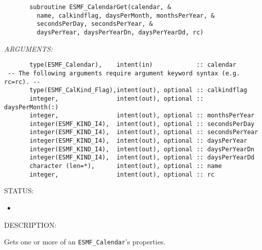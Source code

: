  
\begin{verbatim}       subroutine ESMF_CalendarGet(calendar, &
         name, calkindflag, daysPerMonth, monthsPerYear, &
         secondsPerDay, secondsPerYear, &
         daysPerYear, daysPerYearDn, daysPerYearDd, rc)
 \end{verbatim}{\em ARGUMENTS:}
\begin{verbatim}       type(ESMF_Calendar),    intent(in)            :: calendar
 -- The following arguments require argument keyword syntax (e.g. rc=rc). --
       type(ESMF_CalKind_Flag),intent(out), optional :: calkindflag
       integer,                intent(out), optional :: daysPerMonth(:)
       integer,                intent(out), optional :: monthsPerYear
       integer(ESMF_KIND_I4),  intent(out), optional :: secondsPerDay
       integer(ESMF_KIND_I4),  intent(out), optional :: secondsPerYear
       integer(ESMF_KIND_I4),  intent(out), optional :: daysPerYear
       integer(ESMF_KIND_I4),  intent(out), optional :: daysPerYearDn
       integer(ESMF_KIND_I4),  intent(out), optional :: daysPerYearDd
       character (len=*),      intent(out), optional :: name
       integer,                intent(out), optional :: rc
 \end{verbatim}
{\sf STATUS:}
   \begin{itemize}
   \item{}
   \end{itemize}
  
{\sf DESCRIPTION:\\ }


       Gets one or more of an {\tt ESMF\_Calendar}'s properties.
  

